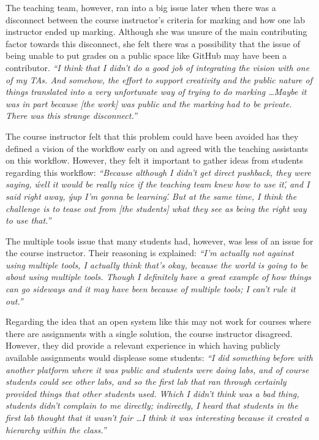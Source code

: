 The teaching team, however, ran into a big issue later when there was a disconnect between the course instructor's criteria for marking and how one lab instructor ended up marking. Although she was unsure of the main contributing factor towards this disconnect, she felt there was a possibility that the issue of being unable to put grades on a public space like GitHub may have been a contributor. \textit{``I think that I didn't do a good job of integrating the vision with one of my TAs. And somehow, the effort to support creativity and the public nature of things translated into a very unfortunate way of trying to do marking \ldots Maybe it was in part because [the work] was public and the marking had to be private. There was this strange disconnect.''}

The course instructor felt that this problem could have been avoided has they defined a vision of the workflow early on and agreed with the teaching assistants on this workflow. However, they felt it important to gather ideas from students regarding this workflow: \textit{``Because although I didn't get direct pushback, they were saying, \'well it would be really nice if the teaching team knew how to use it\', and I said right away, \'yup I'm gonna be learning\'. But at the same time, I think the challenge is to tease out from [the students] what they see as being the right way to use that.''}

The multiple tools issue that many students had, however, was less of an issue for the course instructor. Their reasoning is explained: \textit{``I'm actually not against using multiple tools, I actually think that's okay, because the world is going to be about using multiple tools. Though I definitely have a great example of how things can go sideways and it may have been because of multiple tools; I can't rule it out.''}

Regarding the idea that an open system like this may not work for courses where there are assignments with a single solution, the course instructor disagreed. However, they did provide a relevant experience in which having publicly available assignments would displease some students: \textit{``I did something before with another platform where it was public and students were doing labs, and of course students could see other labs, and so the first lab that ran through certainly provided things that other students used. Which I didn't think was a bad thing, students didn't complain to me directly; indirectly, I heard that students in the first lab thought that it wasn't fair \ldots I think it was interesting because it created a hierarchy within the class.''}


